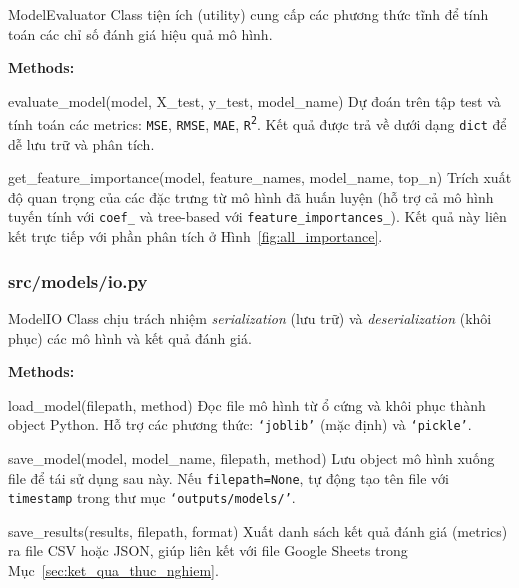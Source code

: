 \documentclass[12pt,a4paper]{article}
\newenvironment{methodlist}{
    \begin{description}[style=nextline, font=\ttfamily\color{sklearn-blue}]
}{
    \end{description}
}
\begin{document}
\begin{classbox}{ModelEvaluator}
Class tiện ích (utility) cung cấp các phương thức tĩnh để tính toán các chỉ số đánh giá hiệu quả mô hình.

\vspace{0.2cm}
\textbf{Methods:}
\begin{methodlist}
    \item[evaluate\_model(model, X\_test, y\_test, model\_name)] 
    Dự đoán trên tập test và tính toán các metrics: \texttt{MSE}, \texttt{RMSE}, \texttt{MAE}, \texttt{R\textsuperscript{2}}. 
    Kết quả được trả về dưới dạng \texttt{dict} để dễ lưu trữ và phân tích.
    
    \item[get\_feature\_importance(model, feature\_names, model\_name, top\_n)] 
    Trích xuất độ quan trọng của các đặc trưng từ mô hình đã huấn luyện (hỗ trợ cả mô hình tuyến tính với \texttt{coef\_} và tree-based với \texttt{feature\_importances\_}). 
    Kết quả này liên kết trực tiếp với phần phân tích ở Hình~\ref{fig:all_importance}.
\end{methodlist}
\end{classbox}

\subsubsection{src/models/io.py}

\begin{classbox}{ModelIO}
Class chịu trách nhiệm \textit{serialization} (lưu trữ) và \textit{deserialization} (khôi phục) các mô hình và kết quả đánh giá.

\vspace{0.2cm}
\textbf{Methods:}
\begin{methodlist}
    \item[load\_model(filepath, method)] 
    Đọc file mô hình từ ổ cứng và khôi phục thành object Python. 
    Hỗ trợ các phương thức: \texttt{`joblib'} (mặc định) và \texttt{`pickle'}.
    
    \item[save\_model(model, model\_name, filepath, method)] 
    Lưu object mô hình xuống file để tái sử dụng sau này. Nếu \texttt{filepath=None}, tự động tạo tên file với \texttt{timestamp} trong thư mục \texttt{`outputs/models/'}.
    
    \item[save\_results(results, filepath, format)] 
    Xuất danh sách kết quả đánh giá (metrics) ra file CSV hoặc JSON, giúp liên kết với file Google Sheets trong Mục~\ref{sec:ket_qua_thuc_nghiem}.
\end{methodlist}
\end{classbox}
\end{document}
